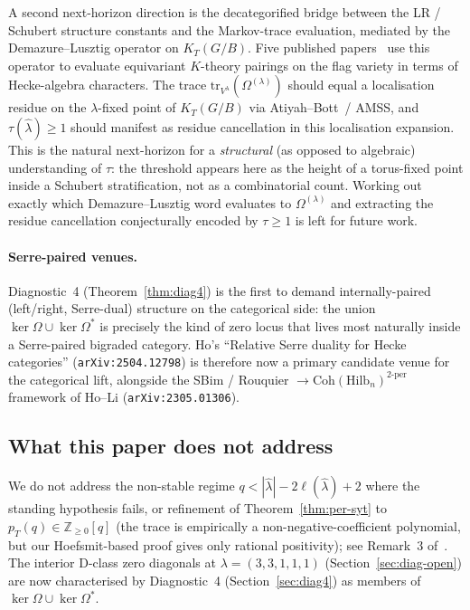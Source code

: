 \documentclass[11pt]{article}
\theoremstyle{definition}
\newcommand{\Vlam}{V^{\lambda}}
\newcommand{\Om}{\Omega}
\newcommand{\bla}{\widehat\lambda}
\newcommand{\elh}{\ell(\bla)}
\newcommand{\tr}{\mathrm{tr}}
\begin{document}
A second next-horizon direction is the decategorified bridge between
the LR / Schubert structure constants and the Markov-trace evaluation,
mediated by the Demazure--Lusztig operator on $K_T(G/B)$.  Five published
papers~\cite{amss2019,brubakerBBG2019,brubaker2024,gwzj2025,cheng2025} use
this operator to evaluate equivariant $K$-theory pairings on the flag
variety in terms of Hecke-algebra characters.  The trace
$\tr_{\Vlam}(\Om^{(\lambda)})$ should equal a localisation residue on the
$\lambda$-fixed point of $K_T(G/B)$ via Atiyah--Bott~/ AMSS, and
$\tau(\bla) \ge 1$ should manifest as residue cancellation in this
localisation expansion.  This is the natural next-horizon for a
\emph{structural} (as opposed to algebraic) understanding of $\tau$: the
threshold appears here as the height of a torus-fixed point inside a
Schubert stratification, not as a combinatorial count.  Working out
exactly which Demazure--Lusztig word evaluates to $\Om^{(\lambda)}$ and
extracting the residue cancellation conjecturally encoded by $\tau \ge 1$
is left for future work.

\paragraph{Serre-paired venues.}  Diagnostic~4
(Theorem~\ref{thm:diag4}) is the first to demand internally-paired
(left/right, Serre-dual) structure on the categorical side: the union
$\ker \Om \cup \ker \Om^{*}$ is precisely the kind of zero locus that
lives most naturally inside a Serre-paired bigraded category.  Ho's
``Relative Serre duality for Hecke categories'' (\texttt{arXiv:2504.12798})
is therefore now a primary candidate venue for the categorical lift,
alongside the SBim / Rouquier $\to \mathrm{Coh}(\mathrm{Hilb}_n)^{2\text{-per}}$
framework of Ho--Li (\texttt{arXiv:2305.01306}).

\subsection{What this paper does not address}

We do not address the non-stable regime $q < |\bla| - 2\elh + 2$ where
the standing hypothesis fails, or refinement of
Theorem~\ref{thm:per-syt} to $p_T(q) \in \mathbb{Z}_{\ge 0}[q]$ (the trace
is empirically a non-negative-coefficient polynomial, but our
Hoefsmit-based proof gives only rational positivity); see Remark~3
of~\cite{conversePerSYT}.  The interior D-class zero diagonals at
$\lambda = (3,3,1,1,1)$
(Section~\ref{sec:diag-open}) are now characterised by Diagnostic~4
(Section~\ref{sec:diag4}) as members of $\ker\Om \cup \ker\Om^{*}$.
\end{document}
